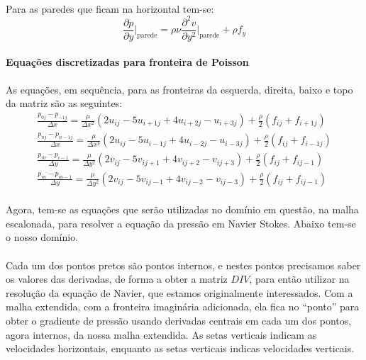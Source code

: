 \documentclass[poisson.tex]{subfiles}
\begin{document}
\paragraph{} Para as paredes que ficam na horizontal tem-se:
\begin{equation}
\frac{\partial p}{\partial y}\Bigg|_{\textrm{parede}}=\rho\nu\frac{\partial^2
v}{\partial y^2}\Bigg|_{\textrm{parede}}+\rho f_y
\end{equation}
\paragraph{Equações discretizadas para fronteira de Poisson} As equações, em
sequência, para as fronteiras da esquerda, direita, baixo e topo da matriz são
as seguintes:
\begin{eqnarray}
\frac{p_{0j}-p_{-1j}}{\Delta x}=\frac{\mu}{\Delta x^2}(2u_{ij}-5u_{i+1j}+4u_{i+2j}-u_{i+3j})+\frac{\rho}{2}(f_{ij}+f_{i+1j}) \label{pressure_01}\\
\frac{p_{nj}-p_{n-1j}}{\Delta x}=\frac{\mu}{\Delta x^2}(2u_{ij}-5u_{i-1j}+4u_{i-2j}-u_{i-3j})+\frac{\rho}{2}(f_{ij}+f_{i-1j})\label{pressure_02}\\
\frac{p_{i0}-p_{i-1}}{\Delta y}=\frac{\mu}{\Delta y^2}(2v_{ij}-5v_{ij+1}+4v_{ij+2}-v_{ij+3})+\frac{\rho}{2}(f_{ij}+f_{ij-1}) \label{pressure_03}\\
\frac{p_{in}-p_{in-1}}{\Delta y}=\frac{\mu}{\Delta y^2}(2v_{ij}-5v_{ij-1}+4v_{ij-2}-v_{ij-3})+\frac{\rho}{2}(f_{ij}+f_{ij-1}) \label{pressure_04}
\end{eqnarray}
\paragraph{} Agora, tem-se as equações que serão utilizadas no domínio em questão, na malha escalonada, para resolver a equação da pressão em Navier Stokes. Abaixo tem-se o nosso domínio.
\domainOne

\paragraph{} Cada um dos pontos pretos são pontos internos, e nestes pontos precisamos saber os valores das derivadas, de forma a obter a matriz $DIV$, para então utilizar na resolução da equação de Navier, que estamos originalmente interessados. Com a malha extendida, com a fronteira imaginária adicionada, ela fica no ``ponto'' para obter o gradiente de pressão usando derivadas centrais em cada um dos pontos, agora internos, da nossa malha extendida. As setas verticais indicam as velocidades horizontais, enquanto as setas verticais indicas velocidades verticais. 
\end{document}
